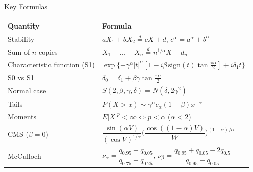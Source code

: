 \begin{frame}{Key Formulas}
\itemsize{\small}
{\renewcommand{\arraystretch}{1.45}\begin{center}
\scriptsize
\begin{tabular}{ll}
\toprule
\textbf{Quantity} & \textbf{Formula} \\
\midrule
Stability & $aX_1 + bX_2 \overset{d}{=} cX + d$, \quad $c^\alpha = a^\alpha + b^\alpha$ \\
Sum of $n$ copies & $X_1 + \dots + X_n \overset{d}{=} n^{1/\alpha}X + d_n$ \\
Characteristic function (S1) & $\exp\{-\gamma^\alpha|t|^\alpha[1 - i\beta\,\mathrm{sign}(t)\tan\frac{\pi\alpha}{2}] + i\delta_1 t\}$ \\
S0 vs S1 & $\delta_0 = \delta_1 + \beta\gamma\tan\frac{\pi\alpha}{2}$ \\
Normal case & $S(2, \beta, \gamma, \delta) = N(\delta, 2\gamma^2)$ \\
Tails & $P(X > x) \sim \gamma^\alpha c_\alpha(1 + \beta)x^{-\alpha}$ \\
Moments & $E|X|^p < \infty \iff p < \alpha$ \quad ($\alpha < 2$) \\
CMS ($\beta = 0$) & $\dfrac{\sin(\alpha V)}{(\cos V)^{1/\alpha}}\Big(\dfrac{\cos((1-\alpha)V)}{W}\Big)^{(1-\alpha)/\alpha}$ \\
McCulloch & $\nu_\alpha = \dfrac{q_{0.95} - q_{0.05}}{q_{0.75} - q_{0.25}}$, \quad $\nu_\beta = \dfrac{q_{0.95} + q_{0.05} - 2q_{0.5}}{q_{0.95} - q_{0.05}}$ \\
\bottomrule
\end{tabular}
\end{center}
}
\end{frame}

